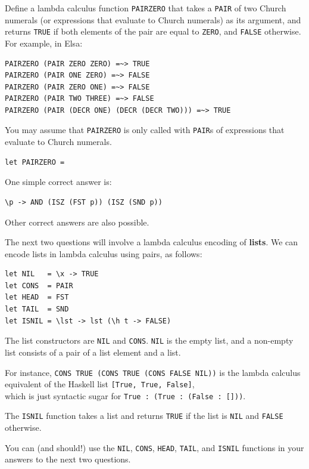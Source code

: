 \documentclass[addpoints,answers]{exam}
\begin{document}
\begin{questions}
\question[7] Define a lambda calculus function \texttt{PAIRZERO} that takes a \texttt{PAIR} of two Church numerals (or expressions that evaluate to Church numerals) as its argument, and returns \texttt{TRUE} if both elements of the pair are equal to \texttt{ZERO}, and \texttt{FALSE} otherwise.  For example, in Elsa:

\begin{verbatim}
PAIRZERO (PAIR ZERO ZERO) =~> TRUE
PAIRZERO (PAIR ONE ZERO) =~> FALSE
PAIRZERO (PAIR ZERO ONE) =~> FALSE
PAIRZERO (PAIR TWO THREE) =~> FALSE
PAIRZERO (PAIR (DECR ONE) (DECR (DECR TWO))) =~> TRUE
\end{verbatim}

You may assume that \texttt{PAIRZERO} is only called with \texttt{PAIR}s of expressions that evaluate to Church numerals.

\begin{verbatim}
let PAIRZERO = 
\end{verbatim}
\begin{solutionorbox}[2in]
One simple correct answer is:
\begin{verbatim}
\p -> AND (ISZ (FST p)) (ISZ (SND p))
\end{verbatim}
Other correct answers are also possible.
\end{solutionorbox}

\newpage

The next two questions will involve a lambda calculus encoding of \textbf{lists}.  We can encode lists in lambda calculus using pairs, as follows:

\begin{verbatim}
let NIL   = \x -> TRUE
let CONS  = PAIR
let HEAD  = FST
let TAIL  = SND
let ISNIL = \lst -> lst (\h t -> FALSE)
\end{verbatim}

The list constructors are \texttt{NIL} and \texttt{CONS}.  \texttt{NIL} is the empty list, and a non-empty list consists of a pair of a list element and a list.

For instance, \texttt{CONS TRUE (CONS TRUE (CONS FALSE NIL))} is the lambda calculus equivalent of the Haskell list \texttt{[True, True, False]},\\
which is just syntactic sugar for \texttt{True : (True : (False : []))}.

The \texttt{ISNIL} function takes a list and returns \texttt{TRUE} if the list is \texttt{NIL} and \texttt{FALSE} otherwise.

You can (and should!) use the \texttt{NIL}, \texttt{CONS}, \texttt{HEAD}, \texttt{TAIL}, and \texttt{ISNIL} functions in your answers to the next two questions.


\end{questions}
\end{document}
